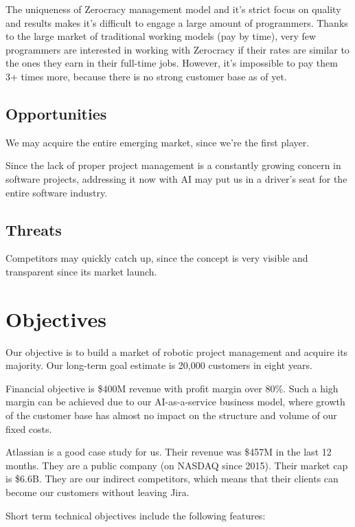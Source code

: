 \documentclass{main}
\begin{document}
The uniqueness of Zerocracy management model and it's strict focus on quality
and results makes it's difficult to engage a large amount of programmers. Thanks
to the large market of traditional working models (pay by time), very few
programmers are interested in working with Zerocracy if their rates are
similar to the ones they earn in their full-time jobs. However, it's impossible
to pay them 3+ times more, because there is no strong customer base as of yet.

\subsection{Opportunities}

We may acquire the entire emerging market, since we're the first player.

Since the lack of proper project management is a constantly growing concern in
software projects, addressing it now with AI may put us in a driver's seat for
the entire software industry.

\subsection{Threats}

Competitors may quickly catch up, since the concept is very visible and
transparent since its market launch.

\section{Objectives}

Our objective is to build a market of robotic project management and acquire its
majority. Our long-term goal estimate is 20,000 customers in eight years.

Financial objective is \$400M revenue with profit margin over 80\%. Such a high
margin can be achieved due to our AI-as-a-service business model, where growth
of the customer base has almost no impact on the structure and volume of our
fixed costs.

Atlassian is a good case study for us. Their revenue was \$457M in the last 12
months. They are a public company (on NASDAQ since 2015). Their market cap is
\$6.6B. They are our indirect competitors, which means that their clients can
become our customers without leaving Jira.

Short term technical objectives include the following features:
\end{document}
